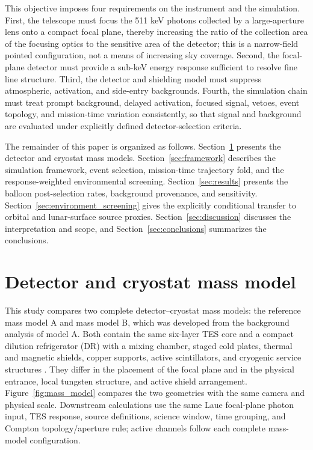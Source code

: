 \documentclass[11pt]{article}
\begin{document}
This objective imposes four requirements on the instrument and the simulation.
First, the telescope must focus the 511 keV photons collected by a large-aperture
lens onto a compact focal plane, thereby increasing the ratio of the collection
area of the focusing optics to the sensitive area of the detector; this is a
narrow-field pointed configuration, not a means of increasing sky coverage.
Second, the focal-plane detector must provide a sub-keV energy response
sufficient to resolve fine line structure. Third, the detector and shielding
model must suppress atmospheric, activation, and side-entry backgrounds.
Fourth, the simulation chain must treat prompt background, delayed activation,
focused signal, vetoes, event topology, and mission-time variation consistently,
so that signal and background are evaluated under explicitly defined
detector-selection criteria.

The remainder of this paper is organized as follows. Section~\ref{sec:geometry}
presents the detector and cryostat mass models. Section~\ref{sec:framework}
describes the simulation framework, event selection, mission-time trajectory
fold, and the response-weighted environmental screening. Section~\ref{sec:results}
presents the balloon post-selection rates, background provenance, and
sensitivity. Section~\ref{sec:environment_screening} gives the explicitly
conditional transfer to orbital and lunar-surface source proxies.
Section~\ref{sec:discussion} discusses the interpretation and scope, and
Section~\ref{sec:conclusions} summarizes the conclusions.

\endgroup

\section{Detector and cryostat mass model}
\label{sec:geometry}

This study compares two complete detector--cryostat mass models: the reference
mass model A and mass model B, which was developed from the background analysis
of model A. Both contain the same six-layer TES core and a compact dilution
refrigerator (DR) with a mixing chamber, staged cold plates, thermal and magnetic
shields, copper supports, active scintillators, and cryogenic service structures
\cite{Shirazi2023,Gottardi2021TESReview}. They differ in the placement of the
focal plane and in the physical entrance, local tungsten structure, and active
shield arrangement. Figure~\ref{fig:mass_model} compares the two geometries with
the same camera and physical scale. Downstream calculations use the same Laue
focal-plane photon input, TES response, source definitions, science window,
time grouping, and Compton topology/aperture rule; active channels follow each
complete mass-model configuration.
\end{document}

